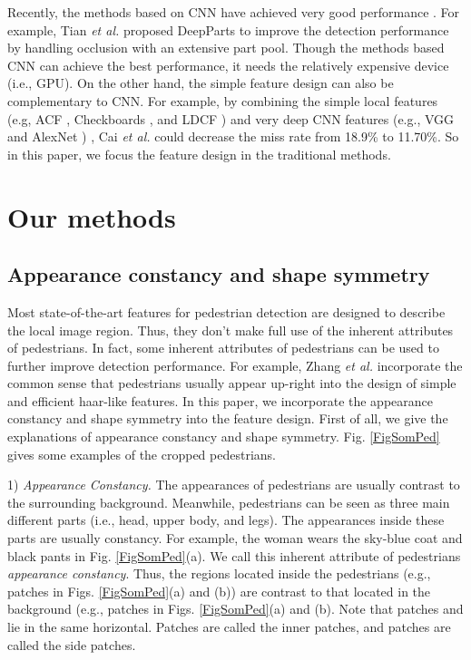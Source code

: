 \documentclass[10pt,twocolumn,letterpaper]{article}
\begin{document}
Recently, the methods based on CNN have achieved very good performance \cite{Cai_DeepPed_ICCV_2015,Luo_SDN_CVPR_2014,Tian_DeepParts_ICCV_2015,Tian_Ta_CVPR_2015,Yang_CCF_ICCV_2015}. For example, Tian \textit{et al.} \cite{Tian_DeepParts_ICCV_2015} proposed DeepParts to improve the
detection performance by handling occlusion
with an extensive part pool. Though the methods based CNN can achieve 
the best performance, it needs the relatively expensive device (i.e., GPU). 
On the other hand, the simple feature design can also be complementary to 
CNN. For example, by combining the simple local features (e.g, ACF \cite{Dollar_ACF_PAMI_2014}, Checkboards \cite{Zhang_FCF_CVPR_2015}, and LDCF \cite{Nam_LDCF_NIPS_2014}) and 
very deep CNN features (e.g., VGG \cite{Simonyan_VGG_arxiv_2014} and AlexNet \cite{Krizhevsky_AlexNet_NIPS_2012}) , Cai \textit{et al.} \cite{Cai_DeepPed_ICCV_2015} could decrease the miss 
rate from 18.9{\%} to 11.70{\%}. So in this paper, we focus the feature design in the traditional methods.

\section{Our methods}
\subsection{Appearance constancy and shape symmetry}
Most state-of-the-art features for pedestrian detection are designed to 
describe the local image region. Thus, they don't make full use of the 
inherent attributes of pedestrians. In fact, some inherent attributes of 
pedestrians can be used to further improve detection performance. For 
example, Zhang \textit{et al.} \cite{Zhang_Info.Haar_CVPR_2014} incorporate the common sense that pedestrians usually 
appear up-right into the design of simple and efficient haar-like features. 
In this paper, we incorporate the appearance constancy and shape symmetry 
into the feature design. First of all, we give the explanations of 
appearance constancy and shape symmetry. Fig. \ref{FigSomPed} gives some examples of the 
cropped pedestrians.

1) \textit{Appearance Constancy.} The appearances of pedestrians are usually contrast to the surrounding 
background. Meanwhile, pedestrians can be seen as three main different parts 
(i.e., head, upper body, and legs). The appearances inside these parts are 
usually constancy. For example, the woman wears the sky-blue coat and black 
pants in Fig. \ref{FigSomPed}(a). We call this inherent attribute of pedestrians 
\textit{appearance constancy}. 
Thus, the regions located inside the pedestrians (e.g., patches  in Figs. \ref{FigSomPed}(a) and (b)) are contrast to that located in the background (e.g., patches  in Figs. \ref{FigSomPed}(a) and (b). Note that patches  and  lie in the same horizontal. Patches  are called the inner patches, and patches  are called the side patches. 
\end{document}
